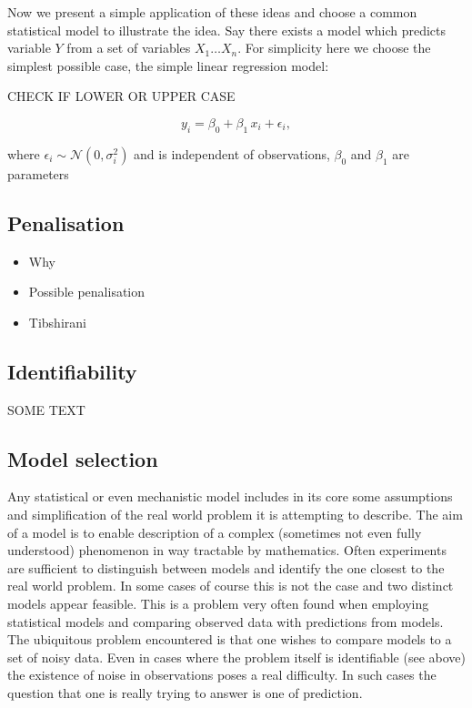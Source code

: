 Now we present a simple application of these ideas and choose a common statistical model to illustrate the idea. Say there exists a model which predicts variable $Y$ from a set of variables $X_1 \ldots X_n$. For simplicity here we choose the simplest possible case, the simple linear regression model:

{\color{red} CHECK IF LOWER OR UPPER CASE}

\begin{equation}
  \label{eq:simple-regression}
  y_i = \beta_0 + \beta_1 \, x_i + \epsilon_i,
\end{equation}

where $\epsilon_i \sim \mathcal{N}(0, \sigma_i^2)$ and is independent of observations, $\beta_0$ and $\beta_1$ are parameters

\subsection{Penalisation}
\label{sec:penalisation}

\begin{itemize}
\item Why
\item Possible penalisation
\item Tibshirani
\end{itemize}
\subsection{Identifiability}
\label{sec:identifiability-back}

SOME TEXT

\subsection{Model selection}
\label{sec:model-selection-1}

Any statistical or even mechanistic model includes in its core some assumptions and simplification of the real world problem it is attempting to describe. The aim of a model is to enable description of a complex (sometimes not even fully understood) phenomenon in way tractable by mathematics. Often experiments are sufficient to distinguish between models and identify the one closest to the real world problem. In some cases of course this is not the case and two distinct models appear feasible. This is a problem very often found when employing statistical models and comparing observed data with predictions from models. The ubiquitous problem encountered is that one wishes to compare models to a set of noisy data. Even in cases where the problem itself is identifiable (see above) the existence of noise in observations poses a real difficulty. In such cases the question that one is really trying to answer is one of prediction. 

